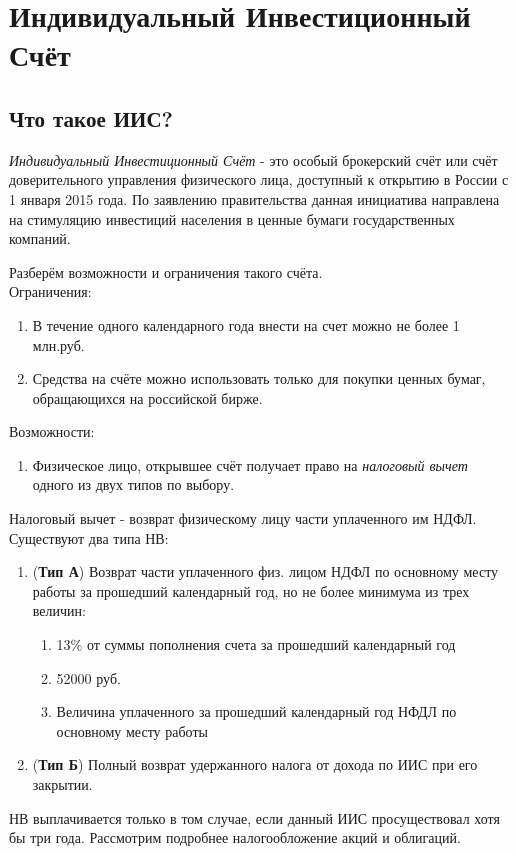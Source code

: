 \section{Индивидуальный Инвестиционный Счёт}
\subsection{Что такое ИИС?}

\textit{Индивидуальный Инвестиционный Счёт} - это особый брокерский счёт или счёт доверительного управления физического лица, доступный к открытию в России с 1 января 2015 года. По заявлению правительства данная инициатива направлена на стимуляцию инвестиций населения в ценные бумаги государственных компаний.

Разберём возможности и ограничения такого счёта.\\
Ограничения:
\begin{enumerate}
    \item В течение одного календарного года внести на счет можно не более 1 млн.руб.
    \item Средства на счёте можно использовать только для покупки ценных бумаг, обращающихся на российской бирже.
\end{enumerate}
Возможности:
\begin{enumerate}
    \item Физическое лицо, открывшее счёт получает право на \textit{налоговый вычет} одного из двух типов по выбору.
\end{enumerate}

Налоговый вычет - возврат  физическому лицу части уплаченного им НДФЛ. Существуют два типа НВ:
\begin{enumerate}
    \item (\textbf{Тип А}) Возврат части уплаченного физ. лицом НДФЛ по основному месту работы за прошедший календарный год, но не более минимума из трех величин:
    \begin{enumerate}
        \item 13\% от суммы пополнения счета за прошедший календарный год
        \item 52000 руб.
        \item Величина уплаченного за прошедший календарный год НФДЛ по основному месту работы
    \end{enumerate}
    \item (\textbf{Тип Б}) Полный возврат удержанного налога от дохода по ИИС при его закрытии.
\end{enumerate}
НВ выплачивается только в том случае, если данный ИИС просуществовал хотя бы три года. Рассмотрим подробнее налогообложение акций и облигаций.
